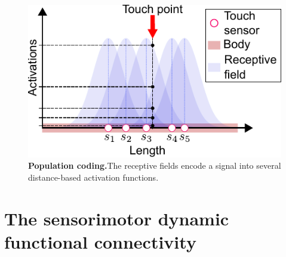 \begin{figure}[!t]
	\begin{center}
		\hspace*{\fill}
		\includegraphics[width=0.99\columnwidth]{touch_receptive_fields.pdf}
		\hspace*{\fill}
	\end{center}
	\caption{\label{fig:population_coding} \textbf{Population coding.}The receptive fields encode a signal into several distance-based activation functions.}
\end{figure}
\section{The sensorimotor dynamic functional connectivity}

